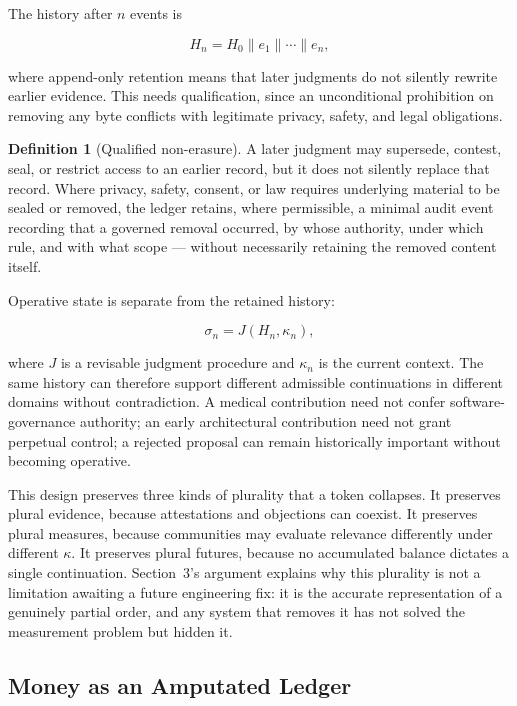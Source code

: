\documentclass[11pt,oneside]{article}
\theoremstyle{plain}
\theoremstyle{definition}
\newtheorem{definition}{Definition}
\begin{document}
The history after $n$ events is

\begin{equation}
H_n = H_0 \mathbin{\|} e_1 \mathbin{\|} \cdots \mathbin{\|} e_n,
\end{equation}

where append-only retention means that later judgments do not silently rewrite earlier evidence. This needs qualification, since an unconditional prohibition on removing any byte conflicts with legitimate privacy, safety, and legal obligations.

\begin{definition}[Qualified non-erasure]
A later judgment may supersede, contest, seal, or restrict access to an earlier record, but it does not silently replace that record. Where privacy, safety, consent, or law requires underlying material to be sealed or removed, the ledger retains, where permissible, a minimal audit event recording that a governed removal occurred, by whose authority, under which rule, and with what scope --- without necessarily retaining the removed content itself.
\end{definition}

Operative state is separate from the retained history:

\begin{equation}
\sigma_n = J(H_n,\kappa_n),
\end{equation}

where $J$ is a revisable judgment procedure and $\kappa_n$ is the current context. The same history can therefore support different admissible continuations in different domains without contradiction. A medical contribution need not confer software-governance authority; an early architectural contribution need not grant perpetual control; a rejected proposal can remain historically important without becoming operative.

This design preserves three kinds of plurality that a token collapses. It preserves plural evidence, because attestations and objections can coexist. It preserves plural measures, because communities may evaluate relevance differently under different $\kappa$. It preserves plural futures, because no accumulated balance dictates a single continuation. Section~3's argument explains why this plurality is not a limitation awaiting a future engineering fix: it is the accurate representation of a genuinely partial order, and any system that removes it has not solved the measurement problem but hidden it.

\subsection{Money as an Amputated Ledger}
\end{document}
